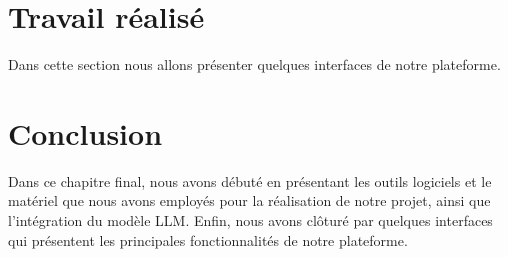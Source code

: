 \newpage
\section{Travail réalisé }
Dans cette section nous allons présenter quelques interfaces de notre plateforme.

\section*{Conclusion}
Dans ce chapitre final, nous avons débuté en présentant les outils logiciels et le matériel que nous avons employés pour la réalisation de notre projet, ainsi que l'intégration du modèle LLM. Enfin, nous avons clôturé par quelques interfaces qui présentent les principales fonctionnalités de notre plateforme.


